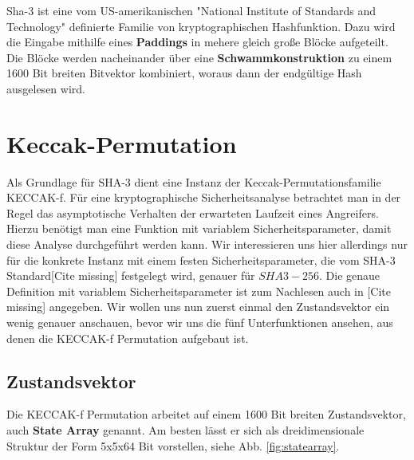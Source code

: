 Sha-3 ist eine vom US-amerikanischen "National Institute of Standards and Technology" definierte Familie von kryptographischen Hashfunktion.
Dazu wird die Eingabe mithilfe eines \textbf{Paddings} in mehere gleich große Blöcke aufgeteilt. Die Blöcke werden nacheinander über eine \textbf{Schwammkonstruktion}
zu einem 1600 Bit breiten Bitvektor kombiniert, woraus dann der endgültige Hash ausgelesen wird. 

\newcommand{\bigcomp}{%
  \DOTSB
  \mathop{\vphantom{\sum}\mathpalette\bigcomp@\relax}%
  \slimits@
}
\newcommand{\bigcomp@}[2]{%
  \begingroup\m@th
  \sbox\z@{$#1\sum$}%
  \setlength{\unitlength}{0.9\dimexpr\ht\z@+\dp\z@}%
  \vcenter{\hbox{%
    \begin{picture}(1,1)
    \bigcomp@linethickness{#1}
    \put(0.5,0.5){\circle{1}}
    \end{picture}%
  }}%
  \endgroup
}
\newcommand{\bigcomp@linethickness}[1]{%
  \linethickness{%
      \ifx#1\displaystyle 2\fontdimen8\textfont\else
      \ifx#1\textstyle 1.65\fontdimen8\textfont\else
      \ifx#1\scriptstyle 1.65\fontdimen8\scriptfont\else
      1.65\fontdimen8\scriptscriptfont\fi\fi\fi 3
  }%
}

\section{Keccak-Permutation}
Als Grundlage für SHA-3 dient eine Instanz der Keccak-Permutationsfamilie KECCAK-f.
Für eine kryptographische Sicherheitsanalyse betrachtet man in der Regel das asymptotische Verhalten der erwarteten Laufzeit eines Angreifers.
Hierzu benötigt man eine Funktion mit variablem Sicherheitsparameter, damit diese Analyse durchgeführt werden kann.
Wir interessieren uns hier allerdings nur für die konkrete Instanz mit einem festen Sicherheitsparameter, die vom SHA-3 Standard[Cite missing] festgelegt wird, genauer für $SHA3-256$.
Die genaue Definition mit variablem Sicherheitsparameter ist zum Nachlesen auch in [Cite missing] angegeben.
Wir wollen uns nun zuerst einmal den Zustandsvektor ein wenig genauer anschauen, bevor wir uns die fünf Unterfunktionen ansehen, aus denen die KECCAK-f Permutation aufgebaut ist.

\subsection{Zustandsvektor}
Die KECCAK-f Permutation arbeitet auf einem 1600 Bit breiten Zustandsvektor, auch \textbf{State Array} genannt.
Am besten lässt er sich als dreidimensionale Struktur der Form 5x5x64 Bit vorstellen, siehe Abb. \ref{fig:statearray}.

